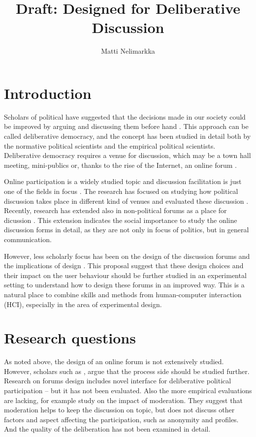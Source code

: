 \documentclass[journal,a4paper]{IEEEtran}
\author{Matti Nelimarkka}
\title{Draft: Designed for Deliberative Discussion}
\begin{document}
\maketitle

\setlength{\parindent}{0pt}
\setlength{\parskip}{1ex}

\section{Introduction}
Scholars of political have suggested that the decisions made in our society could be improved by arguing and discussing them before hand . This approach can be called deliberative democracy, and the concept has been studied in detail both by the normative political scientists and the empirical political scientists. Deliberative democracy requires a venue for discussion, which may be a town hall meeting, mini-publics or, thanks to the rise of the Internet, an online forum .

Online participation is a widely studied topic and discussion facilitation is just one of the fields in focus . The research has focused on studying how political discussion takes place in different kind of venues  and evaluated these discussion . Recently, research has extended also in non-political forums as a place for dicussion \cite{graham12}. This extension indicates the social importance to study the online discussion forms in detail, as they are not only in focus of politics, but in general communication.

However, less scholarly focus has been on the design of the discussion forums and the implications of design . This proposal suggest that these design choices and their impact on the user behaviour should be further studied in an experimental setting to understand how to design these forums in an improved way. This is a natural place to combine skills and methods from human-computer interaction (HCI), especially in the area of experimental design.

\section{Research questions}
As noted above, the design of an online forum is not extensively studied. However, scholars such as , argue that the process side should be studied further.  Research on forums design includes  novel interface for deliberative political participation -- but it has not been evaluated. Also the more empirical evaluations are lacking, for example  study on the impact of moderation. They suggest that moderation helps to keep the discussion on topic, but does not discuss other factors and aspect affecting the participation, such as anonymity and profiles. And the quality of the deliberation has not been examined in detail.
\end{document}
